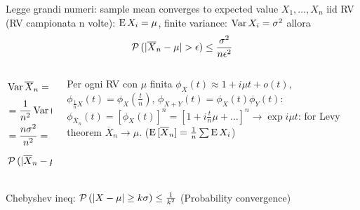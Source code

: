 \documentclass[asd-beamer.tex]{subfiles}%
\begin{document}
\begin{frame}{Legge grandi numeri: sample mean converges to expected value}
$X_1,\ldots,X_n$ iid RV (RV campionata n volte): $\operatorname{E}{X_i}=\mu$, finite variance: $\operatorname{Var}{X_i}=\sigma^2$ allora \[\prob{(|\overline{X}_n-\mu|>\epsilon)}\leq\frac{\sigma^2}{n\epsilon^2}\]
    \begin{columns}
    \begin{column}{0.4\textwidth}
\begin{align*}
&\var{\overline{X}_n}=\var{\frac{1}{n}(X_1+\ldots+X_n)}\\
&=\frac{1}{n^2}\var{(X_1+\ldots+X_n)}\\
&=\frac{n\sigma^2}{n^2}=\frac{\sigma^2}{n}\\
&\prob{(|\overline{X}_n-\mu|>\epsilon)}\leq\frac{\sigma^2}{n\epsilon^2}
\end{align*}
    \end{column}
    \begin{column}{0.6\textwidth}
Per ogni RV con $\mu$ finita 
$\phi_X(t)\approx1+i\mu t+o(t)$,$\phi_{\frac{1}{n}X}(t)=\phi_X(\frac{t}{n})$, $\phi_{X+Y}(t)=\phi_X(t)\phi_Y(t)$:
$\phi_{\overline{X}_n}(t)=[\phi_X(t)]^n=[1+i\frac{t}{n}\mu+\ldots]^n\to\exp{i\mu t}$: for Levy theorem $\overline{X}_n\to\mu$. ($\operatorname{E}{[\overline{X}_n]}=\frac{1}{n}\sum\operatorname{E}{X_i}$)
    \end{column}
    \end{columns}
Chebyshev ineq: $\operatorname{\mathcal{P}}{(|X-\mu|\geq k\sigma)}\leq\frac{1}{k^2}$ (Probability convergence)
\end{frame}
\end{document}
